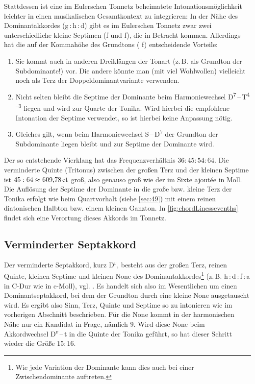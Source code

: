 Stattdessen ist eine im Eulerschen Tonnetz beheimatete Intonationsmöglichkeit
leichter in einen musikalischen Gesamtkontext zu integrieren: In der Nähe des
Dominantakkordes (g\,:\,\naturalm h\,:\,d) gibt es im Eulerschen Tonnetz zwar
zwei unterschiedliche kleine Septimen (\natural f und \naturalp f), die in
Betracht kommen.  Allerdings hat die auf der Kommahöhe des Grundtons (\natural
f) entscheidende Vorteile:
\begin{enumerate}
\item Sie kommt auch in anderen Dreiklängen der Tonart (z.\,B. als Grundton der
  Subdominante!) vor.  Die andere könnte man (mit viel Wohlwollen) vielleicht
  noch als Terz der Doppeldominantvariante verwenden.
\item Nicht selten bleibt die Septime der Dominante beim Harmoniewechsel
  D\textsuperscript{$7$}\,–\,T\textsuperscript{$4$–$3$} liegen und wird zur
  Quarte der Tonika.  Wird hierbei die empfohlene Intonation der Septime
  verwendet, so ist hierbei keine Anpassung nötig.
\item Gleiches gilt, wenn beim Harmoniewechsel S\,–\,D\textsuperscript{$7$} der
  Grundton der Subdominante liegen bleibt und zur Septime der Dominante wird.
\end{enumerate}
Der so entstehende Vierklang hat das Frequenzverhältnis $36:45:54:64$. Die
verminderte Quinte (Tritonus) zwischen der großen Terz und der kleinen Septime
ist $45:64\approx 609{,}78\,\text{ct}$ groß, also genauso groß wie der im Sixte
ajoutée in Moll. Die Auflösung der Septime der Dominante in die große bzw.
kleine Terz der Tonika erfolgt wie beim Quartvorhalt (siehe \cref{sec:49}) mit
einem reinen diatonischen Halbton bzw. einem kleinen Ganzton. In
\cref{fig:chordLinessevenths} findet sich eine Verortung dieses Akkords im
Tonnetz.

\subsection{Verminderter Septakkord}
\label{sec:dim7syn}


Der verminderte Septakkord, kurz D$^v$, besteht aus der großen Terz, reinen
Quinte, kleinen Septime und kleinen None des Dominantakkordes\footnote{Wie jede
  Variation der Dominante kann dies auch bei einer Zwischendominante auftreten.}
(z.\,B. h\,:\,d\,:\,f\,:\,\flat a in C-Dur wie in c-Moll),
vgl. \cite[{}11.1]{Skript}. Es handelt sich also im Wesentlichen um einen
Dominantseptakkord, bei dem der Grundton durch eine kleine None ausgetauscht
wird. Es ergibt also Sinn, Terz, Quinte und Septime so zu intonieren wie im
vorherigen Abschnitt beschrieben. Für die None kommt in der harmonischen Nähe
nur ein Kandidat in Frage, nämlich \flatp $9$.  Wird diese None beim
Akkordwechsel D$^v$\,–\,t in die Quinte der Tonika geführt, so hat dieser
Schritt wieder die Größe $15:16$.

